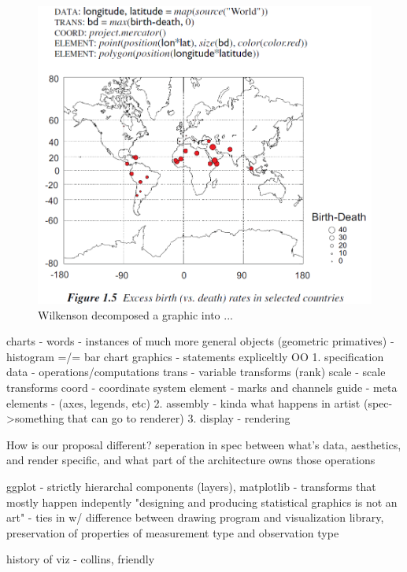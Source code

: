\documentclass[letterpaper,onecolumn,titlepage]{Ythesis}
\begin{document}
\begin{figure}
    \includegraphics{figures/intro/grammar_example.png}
    \caption{Wilkenson decomposed a graphic into ...} 
\end{figure}

charts - words 
    - instances of much more general objects (geometric primatives)
    - histogram =/= bar chart
graphics - statements 
expliceltly OO
    1. specification
        data - operations/computations
        trans - variable transforms (rank)
        scale - scale transforms
        coord - coordinate system
        element - marks and channels
        guide - meta elements - (axes, legends, etc)
    2. assembly - kinda what happens in artist (spec->something that can go to renderer) 
    3. display - rendering

How is our proposal different? seperation in spec between what's data, aesthetics, and render specific, and what part of the architecture owns those operations


ggplot - strictly hierarchal components (layers), matplotlib - transforms that mostly happen indepently 
"designing and producing statistical graphics is not an art" - ties in w/ difference between drawing program and visualization library, preservation of properties of measurement type and observation type

\cite{wickhamGgplot2ElegantGraphics2016}

history of viz - collins, friendly
\end{document}
